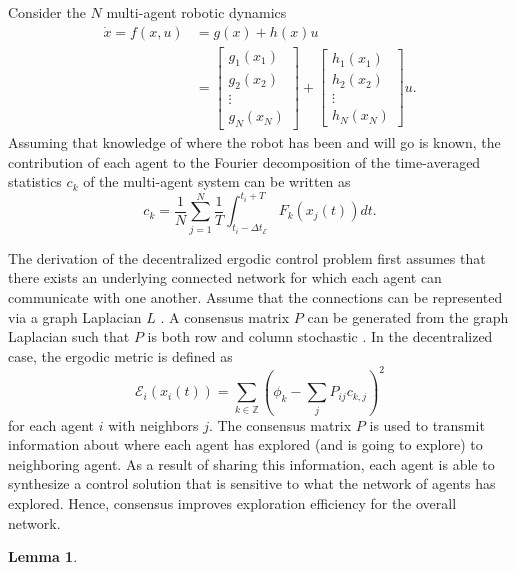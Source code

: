 \documentclass[conference]{IEEEtran}
\newtheorem{lemma}{Lemma}
\begin{document}
Consider the $N$ multi-agent robotic dynamics 
\begin{align}
\dot{x} = f(x, u) &= g(x) + h(x)u \\
& =  \begin{bmatrix}
g_1(x_1) \\
g_2(x_2) \\
\vdots \\
g_{N}(x_N)
\end{bmatrix}
+ \begin{bmatrix}
h_1(x_1) \\
h_2(x_2) \\
\vdots \\
h_{N}(x_N)
\end{bmatrix}u.
\end{align}
Assuming that knowledge of where the robot has been and will go is known, the contribution of each agent to the Fourier decomposition of the time-averaged statistics $c_k$ of the multi-agent system can be written as
\begin{equation}
c_k = \frac{1}{N} \sum_{j=1}^{N} \frac{1}{T} \int_{t_i - \Delta t_\mathcal{E}}^{t_i+T} F_k(x_j(t))dt.
\end{equation}

The derivation of the decentralized ergodic control problem first assumes that there exists an underlying connected network for which each agent can communicate with one another. Assume that the connections can be represented via a graph Laplacian $L$ \cite{deo2016graph}. A consensus matrix $P$ can be generated from the graph Laplacian such that $P$ is both row and column stochastic \cite{deo2016graph, bertsekas1989parallel}. In the decentralized case, the ergodic metric is defined as
 \begin{equation} \label{eq:derg}
\mathcal{E}_i(x_i(t)) = \sum_{k \in \mathbb{Z}} (\phi_k - \sum_j P_{ij} c_{k,j})^2
 \end{equation}
for each agent $i$ with neighbors $j$. The consensus matrix $P$ is used to transmit information about where each agent has explored (and is going to explore) to neighboring agent. As a result of sharing this information, each agent is able to synthesize a control solution that is sensitive to what the network of agents has explored. Hence, consensus improves exploration efficiency for the overall network. 
\begin{lemma}

\end{lemma}
\end{document}
